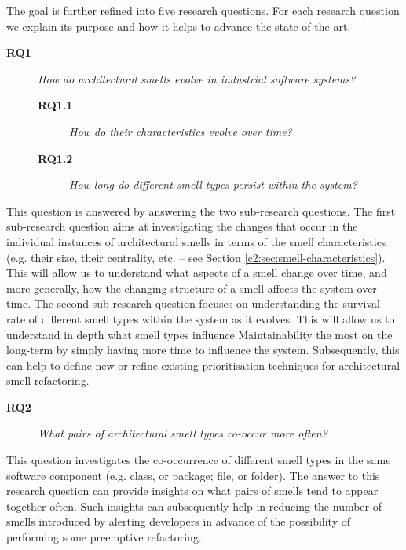 The goal is further refined into five research questions. For each research question we explain its purpose and how it helps to advance the state of the art.

\begin{description}
    \item[\textbf{RQ1}] \textit{How do architectural smells evolve in industrial software systems?}
     \begin{description}
         \item[\textbf{RQ1.1}] \textit{How do their characteristics evolve over time?}
         \item[\textbf{RQ1.2}] \textit{How long do different smell types persist within the system?}
     \end{description} 
\end{description}

This question is answered by answering the two sub-research questions.
The first sub-research question aims at investigating the changes that occur in the individual instances of architectural smells in terms of the smell characteristics (e.g. their size, their centrality, etc. -- see Section \ref{c2:sec:smell-characteristics}). This will allow us to understand what aspects of a smell change over time, and more generally, how the changing structure of a smell affects the system over time.
The second sub-research question focuses on understanding the survival rate of different smell types within the system as it evolves. This will allow us to understand in depth what smell types influence Maintainability the most on the long-term by simply having more time to influence the system. Subsequently, this can help to define new or refine existing prioritisation techniques for architectural smell refactoring.

\begin{description} 
    \item[\textbf{RQ2}] \textit{What pairs of architectural smell types co-occur more often?}
\end{description}
This question investigates the co-occurrence of different smell types in the same software component (e.g. class, or package; file, or folder). The answer to this research question can provide insights on what pairs of smells tend to appear together often. Such insights can subsequently help in reducing the number of smells introduced by alerting developers in advance of the possibility of performing some preemptive refactoring.

